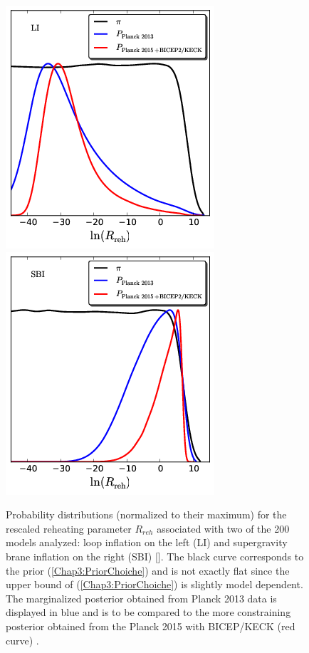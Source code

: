 \documentclass[11pt,a4paper,twoside]{book}
\begin{document}
\begin{figure}
	\centering
	\includegraphics[width=0.45\linewidth, height=0.3\textheight]{Images/Chap3/Martin_Fig2A}
	\includegraphics[width=0.45\linewidth, height=0.3\textheight]{Images/Chap3/Martin_Fig2B}
	\caption{Probability distributions (normalized to their maximum) for the rescaled reheating parameter $ R_{reh} $ associated with two of the 200 models analyzed: loop inflation on the left (LI) and supergravity brane inflation on the right (SBI) [\cite{Chap3:BraneInflation}]. The black curve corresponds to the prior (\ref{Chap3:PriorChoiche}) and is not exactly flat since the upper bound of (\ref{Chap3:PriorChoiche}) is slightly model dependent. The marginalized posterior obtained from  Planck 2013 data is displayed in blue and is to be compared to the more constraining posterior obtained from the Planck 2015 with BICEP/KECK (red curve) \cite{Chap3:Martin_Milestone}.}
	\label{fig:martinfig2a}
\end{figure}
\end{document}
